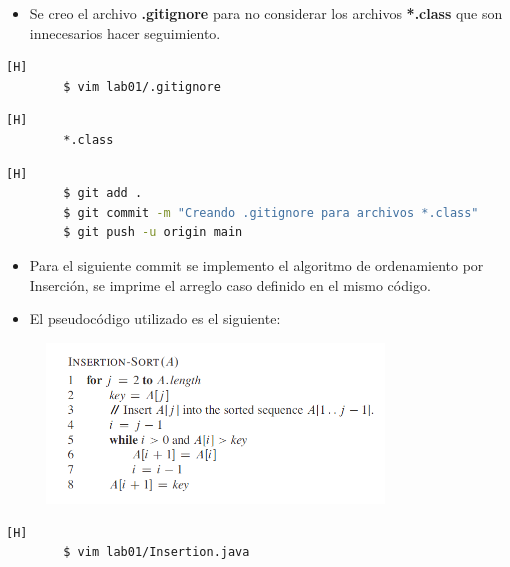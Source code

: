 \documentclass{article}
\begin{document}
	\begin{itemize}	
		\item Se creo el archivo \textbf{.gitignore} para no considerar los archivos \textbf{*.class} que son innecesarios hacer seguimiento.
	\end{itemize}
	\begin{lstlisting}[language=bash,caption={Creando .gitignore}][H]
		$ vim lab01/.gitignore
	\end{lstlisting}
	\begin{lstlisting}[language=bash,caption={lab01/.gitignore}][H]
		*.class
	\end{lstlisting}
	\begin{lstlisting}[language=bash,caption={Commit: Creando .gitignore para archivos *.class}][H]
		$ git add .
		$ git commit -m "Creando .gitignore para archivos *.class"			
		$ git push -u origin main
	\end{lstlisting}
	
	\begin{itemize}	
		\item Para el siguiente commit se implemento el algoritmo de ordenamiento por Inserción, se imprime el arreglo caso definido en el mismo código.
		\item El pseudocódigo utilizado es el siguiente:
	\end{itemize}	
	
	\begin{figure}[H]
		\centering
		\includegraphics[width=0.8\textwidth,keepaspectratio]{img/pseudocodigo_insercion.png}
	\end{figure}
	
	\clearpage
	
	\begin{lstlisting}[language=bash,caption={Creando .gitignore}][H]
		$ vim lab01/Insertion.java
	\end{lstlisting}
	
	
	
\end{document}
